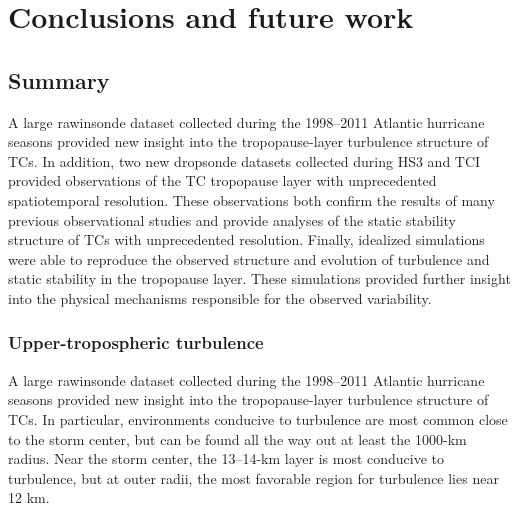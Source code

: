  
\chapter{Conclusions and future work}
\label{chapter:conclusions}
\resetfootnote %

\section{Summary}

A large rawinsonde dataset collected during the 1998--2011 Atlantic hurricane seasons provided new insight into the tropopause-layer turbulence structure of TCs.
In addition, two new dropsonde datasets collected during HS3 and TCI provided observations of the TC tropopause layer with unprecedented spatiotemporal resolution.
These observations both confirm the results of many previous observational studies and provide analyses of the static stability structure of TCs with unprecedented resolution.
Finally, idealized simulations were able to reproduce the observed structure and evolution of turbulence and static stability in the tropopause layer.
These simulations provided further insight into the physical mechanisms responsible for the observed variability.

\subsection{Upper-tropospheric turbulence}
A large rawinsonde dataset collected during the 1998--2011 Atlantic hurricane seasons provided new insight into the tropopause-layer turbulence structure of TCs.
In particular, environments conducive to turbulence are most common close to the storm center, but can be found all the way out at least the 1000-km radius.
Near the storm center, the 13--14-km layer is most conducive to turbulence, but at outer radii, the most favorable region for turbulence lies near 12 km.

